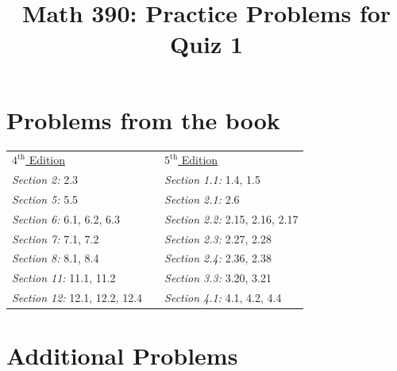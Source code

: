 \documentclass{article}
\title{Math 390: Practice Problems for Quiz 1}
\author{}
\date{}
\begin{document}

\maketitle

\setlength{\parindent}{0em} %
\setlength{\parskip}{1em} %


\section*{Problems from the book}
\begin{center}
\begin{tabular}{lll}
	\underline{$4^{\text{th}}$ Edition} & & \underline{$5^{\text{th}}$ Edition} \\
	{ \it Section 2:} 2.3 & & { \it Section 1.1:} 1.4, 1.5 \\
	{ \it Section 5:} 5.5 & & { \it Section 2.1:} 2.6 \\
	{ \it Section 6:} 6.1, 6.2, 6.3 & & { \it Section 2.2:} 2.15, 2.16, 2.17 \\
	{ \it Section 7:} 7.1, 7.2 & & { \it Section 2.3:} 2.27, 2.28 \\
	{ \it Section 8:} 8.1, 8.4 & & { \it Section 2.4:} 2.36, 2.38 \\
	{ \it Section 11:} 11.1, 11.2 & & { \it Section 3.3:} 3.20, 3.21 \\
	{ \it Section 12:} 12.1, 12.2, 12.4 & & { \it Section 4.1:} 4.1, 4.2, 4.4
\end{tabular}
\end{center}

\section*{Additional Problems}
\end{document}
